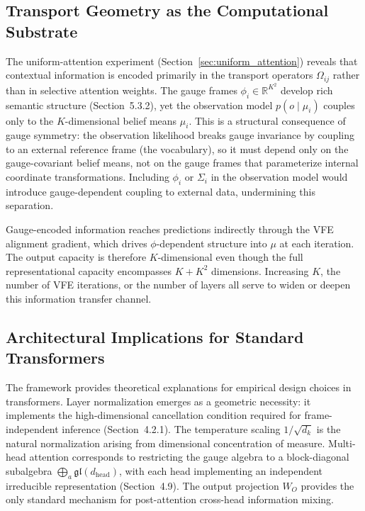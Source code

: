\documentclass[twoside,11pt]{article}
\begin{document}
\subsection{Transport Geometry as the Computational Substrate}

The uniform-attention experiment (Section~\ref{sec:uniform_attention}) reveals that contextual information is encoded primarily in the transport operators $\Omega_{ij}$ rather than in selective attention weights. The gauge frames $\phi_i \in \mathbb{R}^{K^2}$ develop rich semantic structure (Section~5.3.2), yet the observation model $p(o \mid \mu_i)$ couples only to the $K$-dimensional belief means $\mu_i$. This is a structural consequence of gauge symmetry: the observation likelihood breaks gauge invariance by coupling to an external reference frame (the vocabulary), so it must depend only on the gauge-covariant belief means, not on the gauge frames that parameterize internal coordinate transformations. Including $\phi_i$ or $\Sigma_i$ in the observation model would introduce gauge-dependent coupling to external data, undermining this separation.

Gauge-encoded information reaches predictions indirectly through the VFE alignment gradient, which drives $\phi$-dependent structure into $\mu$ at each iteration. The output capacity is therefore $K$-dimensional even though the full representational capacity encompasses $K + K^2$ dimensions. Increasing $K$, the number of VFE iterations, or the number of layers all serve to widen or deepen this information transfer channel.

\subsection{Architectural Implications for Standard Transformers}

The framework provides theoretical explanations for empirical design choices in transformers. Layer normalization emerges as a geometric necessity: it implements the high-dimensional cancellation condition required for frame-independent inference (Section~4.2.1). The temperature scaling $1/\sqrt{d_k}$ is the natural normalization arising from dimensional concentration of measure. Multi-head attention corresponds to restricting the gauge algebra to a block-diagonal subalgebra $\bigoplus_a \mathfrak{gl}(d_{\mathrm{head}})$, with each head implementing an independent irreducible representation (Section~4.9). The output projection $W_O$ provides the only standard mechanism for post-attention cross-head information mixing.
\end{document}
